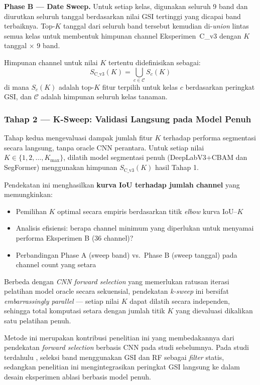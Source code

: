 \textbf{Phase B — Date Sweep.}
Untuk setiap kelas, digunakan seluruh 9 band dan diurutkan seluruh tanggal berdasarkan nilai GSI tertinggi yang dicapai band terbaiknya.
Top-$K$ tanggal dari seluruh band tersebut kemudian di-\textit{union} lintas semua kelas untuk membentuk himpunan channel Eksperimen~C\_v3 dengan $K$ tanggal $\times$ 9 band.

Himpunan channel untuk nilai $K$ tertentu didefinisikan sebagai:
\begin{equation}
    S_{\text{C\_v3}}(K) = \bigcup_{c \in \mathcal{C}} S_c(K)
\end{equation}
di mana $S_c(K)$ adalah top-$K$ fitur terpilih untuk kelas $c$ berdasarkan peringkat GSI, dan $\mathcal{C}$ adalah himpunan seluruh kelas tanaman.

\subsubsection{Tahap 2 — K-Sweep: Validasi Langsung pada Model Penuh}
\label{subsubsec:stage2_ksweep}

Tahap kedua mengevaluasi dampak jumlah fitur $K$ terhadap performa segmentasi secara langsung, tanpa oracle CNN perantara.
Untuk setiap nilai $K \in \{1, 2, \ldots, K_{\max}\}$, dilatih model segmentasi penuh (DeepLabV3+CBAM dan SegFormer) menggunakan himpunan $S_{\text{C\_v3}}(K)$ hasil Tahap 1.

Pendekatan ini menghasilkan \textbf{kurva IoU terhadap jumlah channel} yang memungkinkan:
\begin{itemize}
    \item Pemilihan $K$ optimal secara empiris berdasarkan titik \textit{elbow} kurva IoU--$K$
    \item Analisis efisiensi: berapa channel minimum yang diperlukan untuk menyamai performa Eksperimen B (36 channel)?
    \item Perbandingan Phase A (sweep band) vs.\ Phase B (sweep tanggal) pada channel count yang setara
\end{itemize}

Berbeda dengan \textit{CNN forward selection} yang memerlukan ratusan iterasi pelatihan model oracle secara sekuensial, pendekatan \textit{k-sweep} ini bersifat \textit{embarrassingly parallel} — setiap nilai $K$ dapat dilatih secara independen, sehingga total komputasi setara dengan jumlah titik $K$ yang dievaluasi dikalikan satu pelatihan penuh.

Metode ini merupakan kontribusi penelitian ini yang membedakannya dari pendekatan \textit{forward selection} berbasis CNN pada studi sebelumnya. Pada studi terdahulu \citep{li2023hetao}, seleksi band menggunakan GSI dan RF sebagai \textit{filter} statis, sedangkan penelitian ini mengintegrasikan peringkat GSI langsung ke dalam desain eksperimen ablasi berbasis model penuh.

